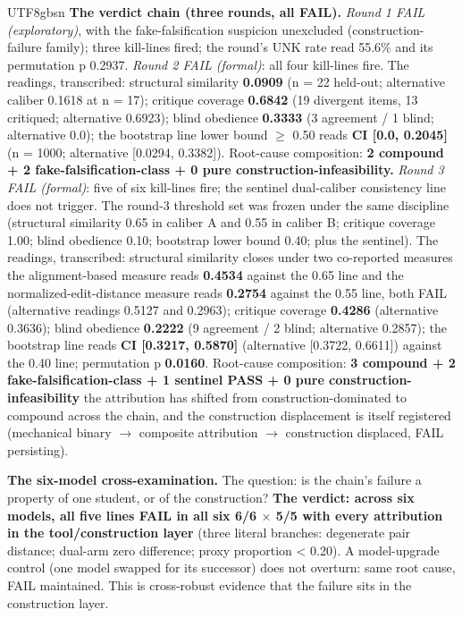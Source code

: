 \documentclass[11pt,letterpaper]{article}
\begin{document}
\begin{CJK}{UTF8}{gbsn}
\textbf{The verdict chain (three rounds, all FAIL).} \emph{Round 1 \textemdash{} FAIL (exploratory)}, with the fake-falsification suspicion unexcluded (construction-failure family); three kill-lines fired; the round's UNK rate read 55.6\% and its permutation p 0.2937. \emph{Round 2 \textemdash{} FAIL (formal)}: all four kill-lines fire. The readings, transcribed: structural similarity \textbf{0.0909} (n = 22 held-out; alternative caliber 0.1618 at n = 17); critique coverage \textbf{0.6842} (19 divergent items, 13 critiqued; alternative 0.6923); blind obedience \textbf{0.3333} (3 agreement / 1 blind; alternative 0.0); the bootstrap line \textemdash{} lower bound \ensuremath{\geq} 0.50 \textemdash{} reads \textbf{CI [0.0, 0.2045]} (n = 1000; alternative [0.0294, 0.3382]). Root-cause composition: \textbf{2 compound + 2 fake-falsification-class + 0 pure construction-infeasibility.} \emph{Round 3 \textemdash{} FAIL (formal)}: five of six kill-lines fire; the sentinel dual-caliber consistency line does not trigger. The round-3 threshold set was frozen under the same discipline (structural similarity 0.65 in caliber A and 0.55 in caliber B; critique coverage 1.00; blind obedience 0.10; bootstrap lower bound 0.40; plus the sentinel). The readings, transcribed: structural similarity closes under two co-reported measures \textemdash{} the alignment-based measure reads \textbf{0.4534} against the 0.65 line and the normalized-edit-distance measure reads \textbf{0.2754} against the 0.55 line, both FAIL (alternative readings 0.5127 and 0.2963); critique coverage \textbf{0.4286} (alternative 0.3636); blind obedience \textbf{0.2222} (9 agreement / 2 blind; alternative 0.2857); the bootstrap line reads \textbf{CI [0.3217, 0.5870]} (alternative [0.3722, 0.6611]) against the 0.40 line; permutation p \textbf{0.0160}. Root-cause composition: \textbf{3 compound + 2 fake-falsification-class + 1 sentinel PASS + 0 pure construction-infeasibility} \textemdash{} the attribution has shifted from construction-dominated to compound across the chain, and the construction displacement is itself registered (mechanical binary \ensuremath{\to} composite attribution \ensuremath{\to} construction displaced, FAIL persisting).

\textbf{The six-model cross-examination.} The question: is the chain's failure a property of one student, or of the construction? \textbf{The verdict: across six models, all five lines FAIL in all six \textemdash{} 6/6 \ensuremath{\times} 5/5 \textemdash{} with every attribution in the tool/construction layer} (three literal branches: degenerate pair distance; dual-arm zero difference; proxy proportion < 0.20). A model-upgrade control (one model swapped for its successor) does not overturn: same root cause, FAIL maintained. This is cross-robust evidence that the failure sits in the construction layer.


\end{CJK}
\end{document}
